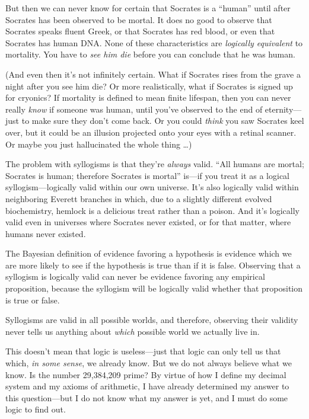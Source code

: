 {
 But then we can never know for certain that Socrates is a
``human'' until after Socrates has
been observed to be mortal. It does no good to observe that Socrates
speaks fluent Greek, or that Socrates has red blood, or even that
Socrates has human DNA. None of these characteristics are
\textit{logically equivalent} to mortality. You have to \textit{see him
die} before you can conclude that he was human.}

{
 (And even then it's not infinitely certain. What
if Socrates rises from the grave a night after you see him die? Or more
realistically, what if Socrates is signed up for cryonics? If mortality
is defined to mean finite lifespan, then you can never really
\textit{know} if someone was human, until you've
observed to the end of eternity---just to make sure they
don't come back. Or you could \textit{think} you saw
Socrates keel over, but it could be an illusion projected onto your
eyes with a retinal scanner. Or maybe you just hallucinated the whole
thing \ldots)}

{
 The problem with syllogisms is that they're
\textit{always} valid. ``All humans are mortal;
Socrates is human; therefore Socrates is mortal''
is---if you treat it as a logical syllogism---logically valid within
our own universe. It's also logically valid within
neighboring Everett branches in which, due to a slightly different
evolved biochemistry, hemlock is a delicious treat rather than a
poison. And it's logically valid even in universes
where Socrates never existed, or for that matter, where humans never
existed.}

{
 The Bayesian definition of evidence favoring a hypothesis is
evidence which we are more likely to see if the hypothesis is true than
if it is false. Observing that a syllogism is logically valid can never
be evidence favoring any empirical proposition, because the syllogism
will be logically valid whether that proposition is true or false.}

{
 Syllogisms are valid in all possible worlds, and therefore,
observing their validity never tells us anything about \textit{which}
possible world we actually live in.}

{
 This doesn't mean that logic is useless---just
that logic can only tell us that which, \textit{in some sense}, we
already know. But we do not always believe what we know. Is the number
29,384,209 prime? By virtue of how I define my decimal system and my
axioms of arithmetic, I have already determined my answer to this
question---but I do not know what my answer is yet, and I must do some
logic to find out.}

